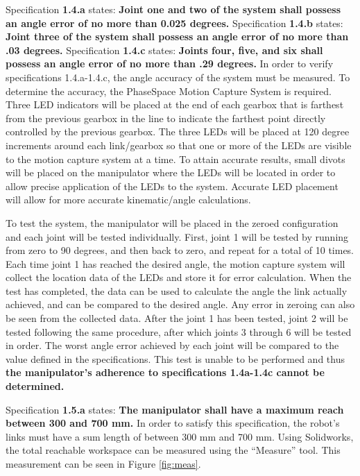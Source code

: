 Specification \textbf{1.4.a} states: \textbf{Joint one and two of the system shall possess an angle error of no more than 0.025 degrees.} Specification \textbf{1.4.b} states: \textbf{Joint three of the system shall possess an angle error of no more than .03 degrees.} Specification \textbf{1.4.c} states: \textbf{Joints four, five, and six shall possess an angle error of no more than .29 degrees.} In order to verify specifications 1.4.a-1.4.c, the angle accuracy of the system must be measured. To determine the accuracy, the PhaseSpace Motion Capture System is required. Three LED indicators will be placed at the end of each gearbox that is farthest from the previous gearbox in the line to indicate the farthest point directly controlled by the previous gearbox. The three LEDs will be placed at 120 degree increments around each link/gearbox so that one or more of the LEDs are visible to the motion capture system at a time. To attain accurate results, small divots will be placed on the manipulator where the LEDs will be located in order to allow precise application of the LEDs to the system. Accurate LED placement will allow for more accurate kinematic/angle calculations.

To test the system, the manipulator will be placed in the zeroed configuration and each joint will be tested individually. First, joint 1 will be tested by running from zero to 90 degrees, and then back to zero, and repeat for a total of 10 times. Each time joint 1 has reached the desired angle, the motion capture system will collect the location data of the LEDs and store it for error calculation. When the test has completed, the data can be used to calculate the angle the link actually achieved, and can be compared to the desired angle. Any error in zeroing can also be seen from the collected data. After the joint 1 has been tested, joint 2 will be tested following the same procedure, after which joints 3 through 6 will be tested in order. The worst angle error achieved by each joint will be compared to the value defined in the specifications. This test is unable to be performed and thus \textbf{the manipulator’s adherence to specifications 1.4a-1.4c cannot be determined.}

Specification \textbf{1.5.a} states: \textbf{The manipulator shall have a maximum reach between 300 and 700 mm.} In order to satisfy this specification, the robot’s links must have a sum length of between 300 mm and 700 mm. Using Solidworks, the total reachable workspace can be measured using the “Measure” tool. This measurement can be seen in Figure \ref{fig:meas}.

